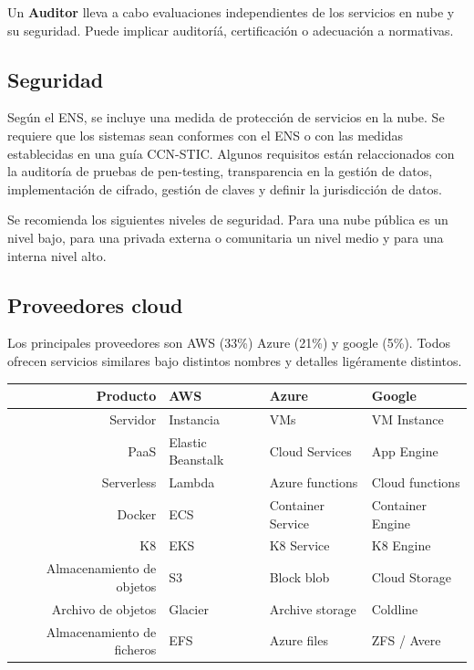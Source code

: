         Un \textbf{Auditor} lleva a cabo evaluaciones independientes de los servicios en nube y su seguridad. Puede implicar auditoríá, certificación o adecuación a normativas.

\subsection{Seguridad}
    Según el ENS, se incluye una medida de protección de servicios en la nube. Se requiere que los sistemas sean conformes con el ENS o con las medidas establecidas en una guía CCN-STIC. Algunos requisitos están relaccionados con la auditoría de pruebas de pen-testing, transparencia en la gestión de datos, implementación de cifrado, gestión de claves y definir la jurisdicción de datos.

    Se recomienda los siguientes niveles de seguridad. Para una nube pública es un nivel bajo, para una privada externa o comunitaria un nivel medio y para una interna nivel alto.

\subsection{Proveedores cloud}
    Los principales proveedores son AWS (33\%) Azure (21\%) y google (5\%). Todos ofrecen servicios similares bajo distintos nombres y detalles ligéramente distintos.

    \begin{table}[H]
    \begin{tabular}{rlll}
        Producto                   & AWS               & Azure             & Google           \\
        \midrule
        Servidor                   & Instancia         & VMs               & VM Instance      \\
        PaaS                       & Elastic Beanstalk & Cloud Services    & App Engine       \\
        Serverless                 & Lambda            & Azure functions   & Cloud functions  \\
        Docker                     & ECS               & Container Service & Container Engine \\
        K8                         & EKS               & K8 Service        & K8 Engine        \\
        Almacenamiento de objetos  & S3                & Block blob        & Cloud Storage    \\ 
        Archivo de objetos         & Glacier           & Archive storage   & Coldline         \\
        Almacenamiento de ficheros & EFS               & Azure files       & ZFS / Avere      \\
    \end{tabular}
    \end{table}


